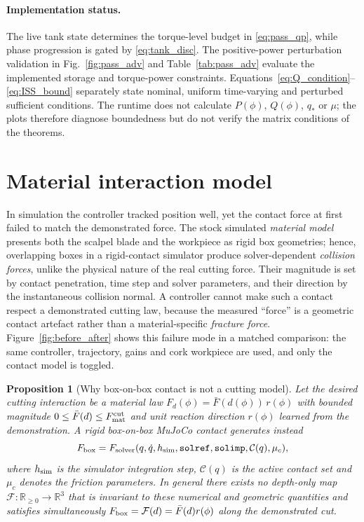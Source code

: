 \documentclass[11pt,a4paper]{article}
\newtheorem{proposition}{Proposition}
\newcommand{\R}{\mathbb{R}}
\begin{document}
\paragraph{Implementation status.} The live tank state determines the
torque-level budget in \eqref{eq:pass_qp}, while phase progression is gated by
\eqref{eq:tank_disc}. The positive-power perturbation validation in
Fig.~\ref{fig:pass_adv} and Table~\ref{tab:pass_adv} evaluate the implemented
storage and torque-power constraints. Equations~\eqref{eq:Q_condition}--\eqref{eq:ISS_bound}
separately state nominal, uniform time-varying and perturbed sufficient
conditions. The runtime does not calculate $P(\phi)$, $Q(\phi)$, $q_*$ or
$\mu$; the plots therefore diagnose boundedness but do not verify the matrix
conditions of the theorems.

\section{Material interaction model}
\label{sec:material}
In simulation the controller tracked position well, yet the contact force at first
failed to match the demonstrated force. The stock simulated \emph{material model}
presents both the scalpel blade and the workpiece as rigid box geometries; hence,
overlapping boxes in a rigid-contact simulator produce solver-dependent
\emph{collision forces}, unlike the physical nature of the real cutting force.
Their magnitude is set by contact penetration, time step and solver parameters,
and their direction by the instantaneous collision normal. A controller cannot
make such a contact respect a demonstrated cutting
law, because the measured ``force'' is a geometric contact artefact rather than a
material-specific \emph{fracture force}. Figure~\ref{fig:before_after} shows this
failure mode in a matched comparison: the same controller, trajectory, gains and
cork workpiece are used, and only the contact model is toggled.

\begin{proposition}[Why box-on-box contact is not a cutting model]
Let the desired cutting interaction be a material law
$F_d(\phi)=\bar F(d(\phi))\,r(\phi)$ with bounded magnitude
$0\le\bar F(d)\le F_{\rm mat}^{\rm cut}$ and unit reaction direction
$r(\phi)$ learned from the demonstration. A rigid box-on-box MuJoCo contact
generates instead
\begin{equation}
F_{\rm box}=F_{\rm solver}(q,\dot q,h_{\rm sim},\texttt{solref},\texttt{solimp},
                          \mathcal C(q),\mu_c),
\label{eq:box_solver}
\end{equation}
where $h_{\rm sim}$ is the simulator integration step,
$\mathcal C(q)$ is the active contact set and
$\mu_c$ denotes the friction parameters. In general there exists no
depth-only map $\mathcal F:\R_{\ge0}\rightarrow\R^3$ that is invariant to these
numerical and geometric quantities and satisfies simultaneously
$F_{\rm box}=\mathcal F(d)=\bar F(d)r(\phi)$ along the demonstrated cut.
\end{proposition}
\end{document}
